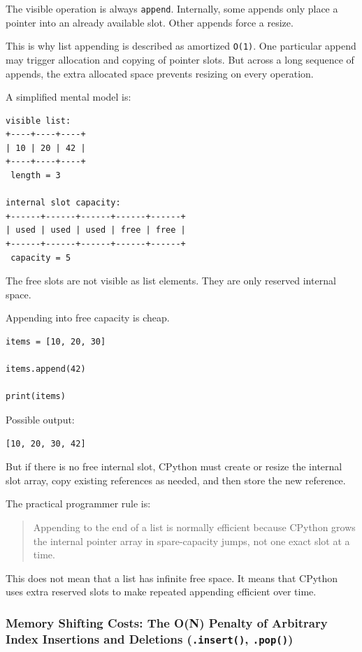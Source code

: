 The visible operation is always \texttt{append}. Internally, some appends only place a pointer into an already available slot. Other appends force a resize.

This is why list appending is described as amortized \texttt{O(1)}. One particular append may trigger allocation and copying of pointer slots. But across a long sequence of appends, the extra allocated space prevents resizing on every operation.

A simplified mental model is:

\begin{verbatim}
visible list:
+----+----+----+
| 10 | 20 | 42 |
+----+----+----+
 length = 3

internal slot capacity:
+------+------+------+------+------+
| used | used | used | free | free |
+------+------+------+------+------+
 capacity = 5
\end{verbatim}

The free slots are not visible as list elements. They are only reserved internal space.

Appending into free capacity is cheap.

\begin{verbatim}
items = [10, 20, 30]

items.append(42)

print(items)
\end{verbatim}

Possible output:

\begin{verbatim}
[10, 20, 30, 42]
\end{verbatim}

But if there is no free internal slot, CPython must create or resize the internal slot array, copy existing references as needed, and then store the new reference.

The practical programmer rule is:

\begin{quote}
Appending to the end of a list is normally efficient because CPython grows the internal pointer array in spare-capacity jumps, not one exact slot at a time.
\end{quote}

This does not mean that a list has infinite free space. It means that CPython uses extra reserved slots to make repeated appending efficient over time.

\subsubsection{Memory Shifting Costs: The O(N) Penalty of Arbitrary Index Insertions and Deletions (\texttt{.insert()}, \texttt{.pop()})}

